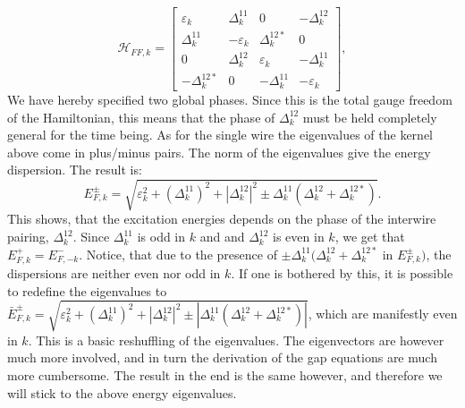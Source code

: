 \begin{equation}
\mathcal{H}_{FF,k} = \begin{bmatrix} \varepsilon_{k}   & \Delta^{11}_k      & 0                 & -\Delta^{12}_{k} \\ 
                                     \Delta^{11}_k     & -\varepsilon_{k}   & \Delta^{12*}_k    & 0 \\ 
                                    0                  & \Delta^{12}_k      & \varepsilon_{k}   & -\Delta^{11}_k \\ 
                                     -\Delta^{12*}_{k} & 0                  & -\Delta^{11}_k     & -\varepsilon_{k} \end{bmatrix},                  
\end{equation}
We have hereby specified two global phases. Since this is the total gauge freedom of the Hamiltonian, this means that the phase of $\Delta^{12}_k$ must be held completely general for the time being. As for the single wire the eigenvalues of the kernel above come in plus/minus pairs. The norm of the eigenvalues give the energy dispersion. The result is:
\begin{equation}
E^{\pm}_{F,k} = \sqrt{\varepsilon^2_k + \left(\Delta^{11}_k\right)^2 + \left|\Delta^{12}_k\right|^2 \pm \Delta^{11}_k(\Delta^{12}_k + \Delta^{12*}_k)}. 
\end{equation} 
This shows, that the excitation energies depends on the phase of the interwire pairing, $\Delta^{12}_k$. Since $\Delta^{11}_k$ is odd in $k$ and and $\Delta^{12}_k$ is even in $k$, we get that $E^{+}_{F,k} = E^{-}_{F,-k}$. Notice, that due to the presence of $\pm \Delta^{11}_k(\Delta^{12}_k + \Delta^{12*}_k$ in $E^{\pm}_{F,k})$, the dispersions are neither even nor odd in $k$. If one is bothered by this, it is possible to redefine the eigenvalues to $\bar{E}^{\pm}_{F,k} = \sqrt{\varepsilon^2_k + \left(\Delta^{11}_k\right)^2 + \left|\Delta^{12}_k\right|^2 \pm |\Delta^{11}_k(\Delta^{12}_k + \Delta^{12*}_k)|}$, which are manifestly even in $k$. This is a basic reshuffling of the eigenvalues. The eigenvectors are however much more involved, and in turn the derivation of the gap equations are much more cumbersome. The result in the end is the same however, and therefore we will stick to the above energy eigenvalues.  

